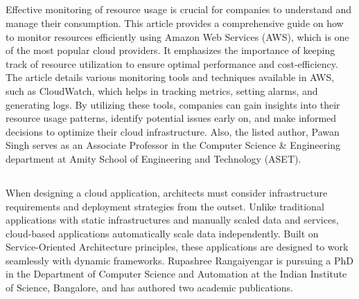 \documentclass[12pt,letterpaper]{article}
\begin{document}
\subsection*{}
Effective monitoring of resource usage is crucial for companies to understand and manage their consumption. This article provides a comprehensive guide on how to monitor resources efficiently using Amazon Web Services (AWS), which is one of the most popular cloud providers. It emphasizes the importance of keeping track of resource utilization to ensure optimal performance and cost-efficiency. The article details various monitoring tools and techniques available in AWS, such as CloudWatch, which helps in tracking metrics, setting alarms, and generating logs. By utilizing these tools, companies can gain insights into their resource usage patterns, identify potential issues early on, and make informed decisions to optimize their cloud infrastructure. Also, the listed author,  Pawan Singh serves as an Associate Professor in the Computer Science & Engineering department at Amity School of Engineering and Technology (ASET).

\subsection*{}
 When designing a cloud application, architects must consider infrastructure requirements and deployment strategies from the outset. Unlike traditional applications with static infrastructures and manually scaled data and services, cloud-based applications automatically scale data independently. Built on Service-Oriented Architecture principles, these applications are designed to work seamlessly with dynamic frameworks. Rupashree Rangaiyengar is pursuing a PhD in the Department of Computer Science and Automation at the Indian Institute of Science, Bangalore, and has authored two academic publications.
\end{document}
